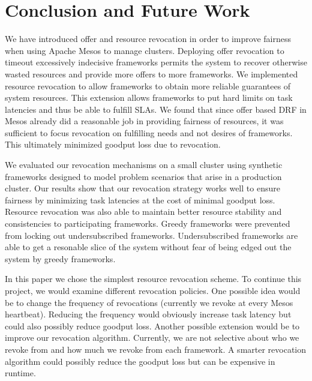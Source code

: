 \section{Conclusion and Future Work}
We have introduced offer and resource revocation in order to improve fairness when using Apache Mesos
to manage clusters. Deploying offer revocation to timeout excessively indecisive frameworks permits the
system to recover otherwise wasted resources and provide more offers to more frameworks. We implemented
resource revocation to allow frameworks to obtain more reliable guarantees of system resources. This
extension allows frameworks to put hard limits on task latencies and thus be able to fulfill SLAs. We
found that since offer based DRF in Mesos already did a reasonable job in providing fairness of
resources, it was sufficient to focus revocation on fulfilling needs and not desires of frameworks. This
ultimately minimized goodput loss due to revocation.

We evaluated our revocation mechanisms on a small cluster using synthetic frameworks designed to model
problem scenarios that arise in a production cluster. Our results show that our revocation strategy
works well to ensure fairness by minimizing task latencies at the cost of minimal goodput loss. Resource
revocation was also able to maintain better resource stability and consistencies to participating
frameworks. Greedy frameworks were prevented from locking out undersubscribed frameworks.
Undersubscribed frameworks are able to get a resonable slice of the system without fear of being edged
out the system by greedy frameworks.

In this paper we chose the simplest resource revocation scheme. To continue this project, we would
examine different revocation policies. One possible idea would be to change the frequency of
revocations (currently we revoke at every Mesos heartbeat). Reducing the frequency would obviously
increase task latency but could also possibly reduce goodput loss. Another possible extension would be
to improve our revocation algorithm. Currently, we are not selective about who we revoke from and how
much we revoke from each framework. A smarter revocation algorithm could possibly reduce the goodput
loss but can be expensive in runtime.
